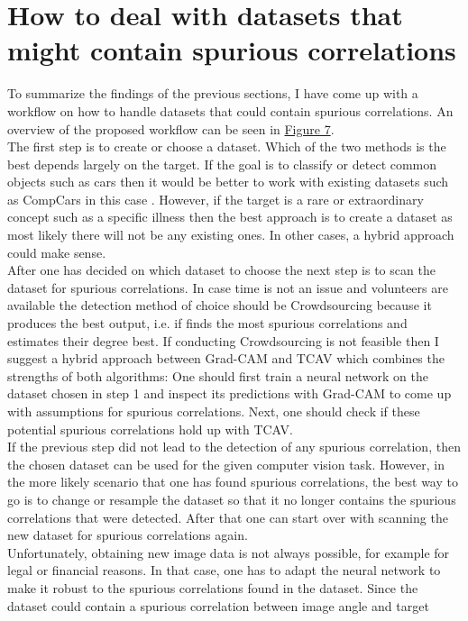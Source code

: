 \documentclass{article}
\begin{document}
\section{How to deal with datasets that might contain spurious correlations}
To summarize the findings of the previous sections, I have come up with a workflow on how to handle datasets that could contain spurious correlations.
An overview of the proposed workflow can be seen in \hyperref[fig:workflow]{Figure 7}. \\
The first step is to create or choose a dataset. Which of the two methods is the best depends largely on the target. If the goal is to classify or
detect common objects such as cars then it would be better to work with existing datasets such as CompCars in this case \cite{Yang_2015_CVPR}.
However, if the target is a rare or extraordinary concept such as a specific illness then the best approach is to create a dataset as most likely there will
not be any existing ones. In other cases, a hybrid approach could make sense. \\
After one has decided on which dataset to choose the next step is to scan the dataset for spurious correlations. In case time is not an issue
and volunteers are available the detection method of choice should be Crowdsourcing because it produces the best output, i.e. if finds the most spurious
correlations and estimates their degree best. If conducting Crowdsourcing is not feasible then I suggest a hybrid approach between Grad-CAM and TCAV which
combines the strengths of both algorithms: One should first train a neural network on the dataset chosen in step 1 and inspect its predictions with Grad-CAM
to come up with assumptions for spurious correlations. Next, one should check if these potential spurious correlations hold up with TCAV. \\
If the previous step did not lead to the detection of any spurious correlation, then the chosen dataset can be used for the given computer vision task. 
However, in the more likely scenario that one has found spurious correlations, the best way to go is to change or resample the dataset so that it no longer
contains the spurious correlations that were detected. After that one can start over with scanning the new dataset for spurious correlations again. \\
Unfortunately, obtaining new image data is not always possible, for example for legal or financial reasons. In that case, one has to adapt the neural network
to make it robust to the spurious correlations found in the dataset. Since the dataset could contain a spurious correlation between image angle and target
\end{document}
